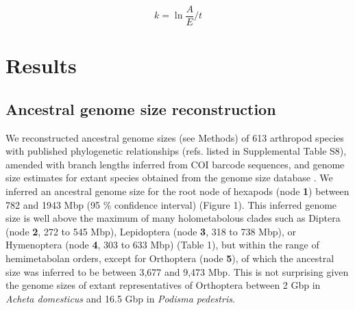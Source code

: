 \[k = \ln{\frac{A}{E}}/t\]

\section{Results}

\subsection*{Ancestral genome size
reconstruction}\label{ancestral-genome-size-reconstruction}

We reconstructed ancestral genome sizes (see Methods) of 613 arthropod
species with published phylogenetic relationships (refs. listed in
Supplemental Table S8), amended with branch lengths inferred from COI
barcode sequences, and genome size estimates for extant species obtained
from the genome size database \citep{Gregory2018}. We inferred an
ancestral genome size for the root node of hexapods (node \textbf{1})
between 782 and 1943 Mbp (95 \% confidence interval) (Figure 1). This
inferred genome size is well above the maximum of many holometabolous
clades such as Diptera (node \textbf{2}, 272 to 545 Mbp), Lepidoptera
(node \textbf{3}, 318 to 738 Mbp), or Hymenoptera (node \textbf{4}, 303
to 633 Mbp) (Table 1), but within the range of hemimetabolan orders,
except for Orthoptera (node \textbf{5}), of which the ancestral size was
inferred to be between 3,677 and 9,473 Mbp. This is not surprising given
the genome sizes of extant representatives of Orthoptera between 2 Gbp
in \emph{Acheta domesticus} and 16.5 Gbp in \emph{Podisma pedestris}.

